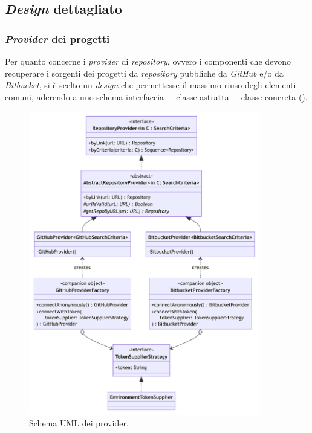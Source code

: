 \subsection{\textit{Design} dettagliato}

\subsubsection*{\textit{Provider} dei progetti}
Per quanto concerne i \textit{provider} di \textit{repository}, ovvero i componenti che devono recuperare i sorgenti dei progetti da \textit{repository} pubbliche da \textit{GitHub} e/o da \textit{Bitbucket}, si è scelto un \textit{design} che permettesse il massimo riuso degli elementi comuni, aderendo a uno schema interfaccia $-$ classe astratta $-$ classe concreta ().

\begin{figure}[h!]
    \centering
    \includegraphics[width=0.9\textwidth]{resources/img/02-provider.pdf}
    \caption{Schema UML dei provider.}
    \label{img:02-provider}
\end{figure}

